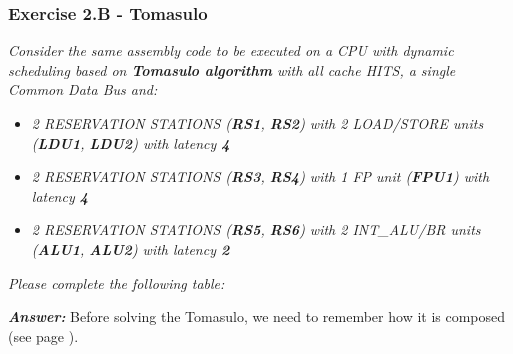 \newpage

\subsubsection*{Exercise 2.B - Tomasulo}

\emph{Consider the same assembly code to be executed on a CPU with dynamic scheduling based on \textbf{Tomasulo algorithm} with all cache HITS, a single Common Data Bus and:}
\begin{itemize}
    \item \emph{2 RESERVATION STATIONS (\textbf{RS1}, \textbf{RS2}) with 2 LOAD/STORE units (\textbf{LDU1}, \textbf{LDU2}) with latency \textbf{4}}
    \item \emph{2 RESERVATION STATIONS (\textbf{RS3}, \textbf{RS4}) with 1 FP unit (\textbf{FPU1}) with latency \textbf{4}}
    \item \emph{2 RESERVATION STATIONS (\textbf{RS5}, \textbf{RS6}) with 2 INT\_ALU/BR units (\textbf{ALU1}, \textbf{ALU2}) with latency \textbf{2}}
\end{itemize}
\emph{Please complete the following table:}

\highspace
\textcolor{Green3}{\textbf{\emph{Answer:}}} Before solving the Tomasulo, we need to remember how it is composed (see page \pageref{fig: tomasulo fpu}).

